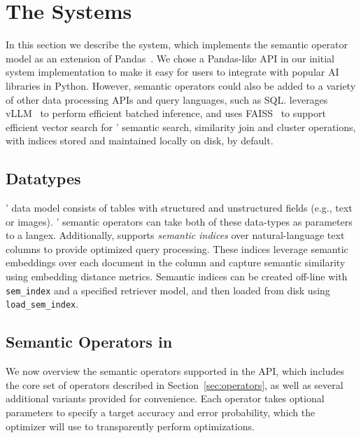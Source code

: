 
\section{The \sys Systems}
\label{subsec:llm_transformations}
In this section we describe the \sys system, which implements the semantic operator model as an extension of Pandas~\cite{pandas}. We chose a Pandas-like API in our initial system implementation to make it easy for users to integrate \sys with popular AI libraries in Python. However, semantic operators could also be added to a variety of other data processing APIs and query languages, such as SQL. 
\sys leverages vLLM~\cite{kwon_efficient_2023} to perform efficient batched inference, and uses FAISS~\cite{douze_faiss_2024, johnson_billion-scale_2017} to support efficient vector search for \sys' semantic search, similarity join and cluster operations, with indices stored and maintained locally on disk, by default.




\subsection{Datatypes} 

\sys' data model consists of tables with structured and unstructured fields (e.g., text or images). \sys' semantic operators can take both of these data-types as parameters to a langex.
Additionally, \sys supports \emph{semantic indices} over natural-language text columns to provide optimized query processing. These indices leverage semantic embeddings over each document in the column and capture semantic similarity using embedding distance metrics. Semantic indices can be created off-line with \verb|sem_index| and a specified retriever model, and then loaded from disk using \verb|load_sem_index|. 



\subsection{Semantic Operators in \sys}
We now overview the semantic operators supported in the \sys API, which includes the core set of operators described in Section~\ref{sec:operators}, as well as several additional variants provided for convenience.
Each operator takes optional parameters to specify a target accuracy and error probability, which the optimizer will use to transparently perform optimizations.

